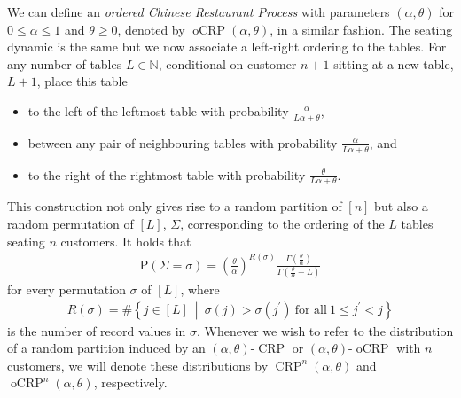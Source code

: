 \documentclass[a4paper, final]{amsart}
\theoremstyle{plain}
\theoremstyle{definition}
\DeclareMathOperator{\crp}{CRP}
\DeclareMathOperator{\ocrp}{oCRP}
\renewcommand{\P}{\mathrm{P}}
\newcommand{\N}{\mathbb{N}}
\begin{document}
\noindent
We can define an \textit{ordered Chinese Restaurant Process} with parameters $(\alpha, \theta)$ for $0 \leq \alpha \leq 1$ and $\theta \geq 0$, denoted by $\ocrp(\alpha, \theta)$, in a similar fashion.
The seating dynamic is the same but we now associate a left-right ordering to the tables.
For any number of tables $L \in \N$, conditional on customer $n+1$ sitting at a new table, $L+1$, place this table
%
\begin{itemize}
  \item to the left of the leftmost table with probability $\frac{\alpha}{L\alpha + \theta}$,
  \item between any pair of neighbouring tables with probability $\frac{\alpha}{L\alpha + \theta}$, and
  \item to the right of the rightmost table with probability $\frac{\theta}{L\alpha + \theta}$.
\end{itemize}
%
This construction not only gives rise to a random partition of $[n]$ but also a random permutation of $[L]$, $\Sigma$, corresponding to the ordering of the $L$ tables seating $n$ customers.
It holds that
%
\begin{align}
  \P \left( \Sigma = \sigma \right)
  = {\left( \frac{\theta}{\alpha} \right)}^{R(\sigma)} \frac{\Gamma\left( \frac{\theta}{\alpha} \right)}{\Gamma\left( \frac{\theta}{\alpha} + L \right)}
  \label{eq:ocrp_tableorder}
\end{align}
%
for every permutation $\sigma$ of $[L]$, where
%
\begin{align*}
  R(\sigma) = \# \left\{ j \in [L] \ \middle \vert \ \sigma(j) > \sigma(j^\prime)\ \text{for all}\ 1 \leq j^\prime < j \right\}
\end{align*}
%
is the number of record values in $\sigma$.
%
Whenever we wish to refer to the distribution of a random partition induced by an $(\alpha, \theta)$-$\crp$ or $(\alpha, \theta)$-$\ocrp$ with $n$ customers, we will denote these distributions by $\crp^n(\alpha, \theta)$ and $\ocrp^n(\alpha, \theta)$, respectively. \\
\end{document}
